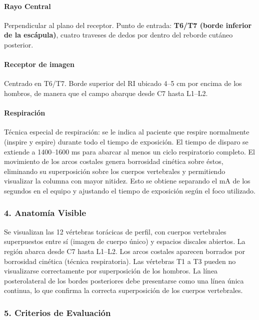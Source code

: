 		\paragraph{Rayo Central}
		Perpendicular al plano del receptor. Punto de entrada: \textbf{T6/T7 (borde inferior de la escápula)}, cuatro traveses de dedos por dentro del reborde cutáneo posterior.
		
		\paragraph{Receptor de imagen}
		Centrado en T6/T7. Borde superior del RI ubicado 4--5 cm por encima de los hombros, de manera que el campo abarque desde C7 hasta L1--L2.
		
		\paragraph{Respiración}
		Técnica especial de respiración: se le indica al paciente que respire normalmente (inspire y espire) durante todo el tiempo de exposición. El tiempo de disparo se extiende a 1400--1600 ms para abarcar al menos un ciclo respiratorio completo. El movimiento de los arcos costales genera borrosidad cinética sobre éstos, eliminando su superposición sobre los cuerpos vertebrales y permitiendo visualizar la columna con mayor nitidez. Esto se obtiene separando el mA de los segundos en el equipo y ajustando el tiempo de exposición según el foco utilizado.
		
		\subsubsection*{4. Anatomía Visible}
		
		Se visualizan las 12 vértebras torácicas de perfil, con cuerpos vertebrales superpuestos entre sí (imagen de cuerpo único) y espacios discales abiertos. La región abarca desde C7 hasta L1--L2. Los arcos costales aparecen borrados por borrosidad cinética (técnica respiratoria). Las vértebras T1 a T3 pueden no visualizarse correctamente por superposición de los hombros. La línea posterolateral de los bordes posteriores debe presentarse como una línea única continua, lo que confirma la correcta superposición de los cuerpos vertebrales.
		
		\subsubsection*{5. Criterios de Evaluación}
		
